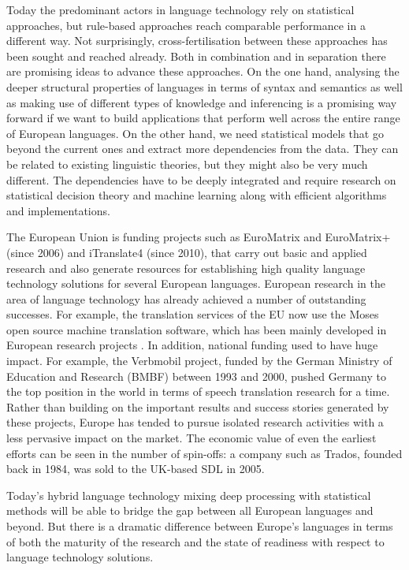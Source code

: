 \documentclass[10pt, plain]{../../metanetpaper}
\begin{document}
\begin{multicols}{2}
Today the predominant actors in language technology rely on statistical approaches, but rule-based approaches reach comparable performance in a different way. Not surprisingly, cross-fertilisation between these approaches has been sought and reached already. Both in combination and in separation there are promising ideas to advance these approaches. On the one hand, analysing the deeper structural properties of languages in terms of syntax and semantics as well as making use of different types of knowledge and inferencing is a promising way forward if we want to build applications that perform well across the entire range of European languages. On the other hand, we need statistical models that go beyond the current ones and extract more dependencies from the data. They can be related to existing linguistic theories, but they might also be very much different. The dependencies have to be deeply integrated and require research on statistical decision theory and machine learning along with efficient algorithms and implementations.

The European Union is funding projects such as EuroMatrix and EuroMatrix+ (since 2006) and iTranslate4 (since 2010), that carry out basic and applied research and also generate resources for establishing high quality language technology solutions for several European languages. European research in the area of language technology has already achieved a number of outstanding successes. For example, the translation services of the EU now use the Moses open source machine translation software, which has been mainly developed in European research projects \cite{moses}. In addition, national funding used to have huge impact. For example, the Verbmobil project, funded by the German Ministry of Education and Research (BMBF) between 1993 and 2000, pushed Germany to the top position in the world in terms of speech translation research for a time. Rather than building on the important results and success stories generated by these projects, Europe has tended to pursue isolated research activities with a less pervasive impact on the market. The economic value of even the earliest efforts can be seen in the number of spin-offs: a company such as Trados, founded back in 1984, was sold to the UK-based SDL in 2005.

Today’s hybrid language technology mixing deep processing with statistical methods will be able to bridge the gap between all European languages and beyond. But there is a dramatic difference between Europe’s languages in terms of both the maturity of the research and the state of readiness with respect to language technology solutions. 


\end{multicols}
\end{document}
